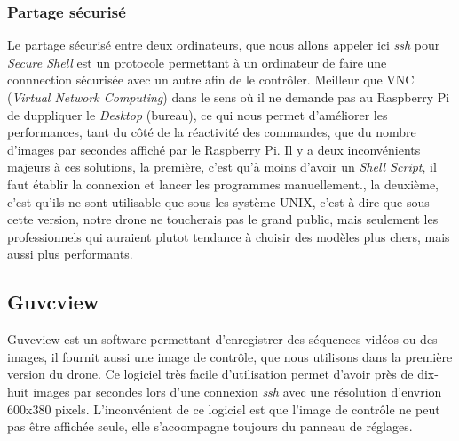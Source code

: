 \documentclass[a4paper,12pt]{report}
\begin{document}
{\subsubsection{Partage sécurisé}

Le partage sécurisé entre deux ordinateurs, que nous allons appeler ici \textit{ssh} pour \textit{Secure Shell} est un protocole permettant à un ordinateur de faire une connnection sécurisée avec un autre afin de le contrôler. Meilleur que VNC (\textit{Virtual Network Computing}) dans le sens où il ne demande pas au Raspberry Pi de duppliquer le \textit{Desktop} (bureau), ce qui nous permet d'améliorer les performances, tant du côté de la réactivité des commandes, que du nombre d'images par secondes affiché par le Raspberry Pi. Il y a deux inconvénients majeurs à ces solutions, la première, c'est qu'à moins d'avoir un \textit{Shell Script}, il faut établir la connexion et lancer les programmes manuellement., la deuxième, c'est qu'ils ne sont utilisable que sous les système UNIX, c'est à dire que sous cette version, notre drone ne toucherais pas le grand public, mais seulement les professionnels qui auraient plutot tendance à choisir des modèles plus chers, mais aussi plus performants. 

\subsection{Guvcview}

Guvcview\label{Guvcview} est un software permettant d'enregistrer des séquences vidéos ou des images, il fournit aussi une image de contrôle, que nous utilisons dans la première version du drone. Ce logiciel très facile d'utilisation permet d'avoir près de dix-huit images par secondes lors d'une connexion \textit{ssh} avec une résolution d'envrion 600x380 pixels. L'inconvénient de ce logiciel est que l'image de contrôle ne peut pas être affichée seule, elle s'acoompagne toujours du panneau de réglages. 

}
\end{document}

